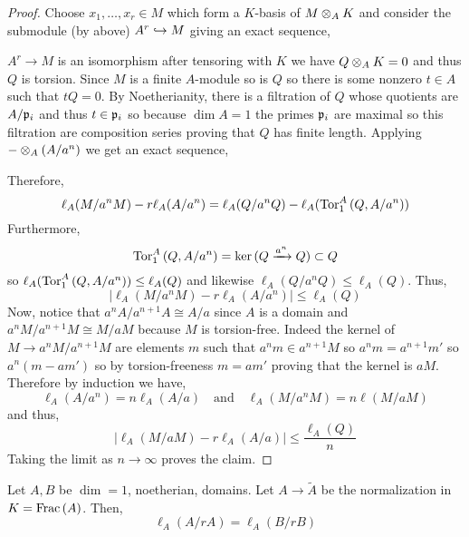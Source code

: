 \documentclass[12pt]{article}
\begin{document}
\begin{proof}
Choose $x_1, \dots, x_r \in M$ which form a $K$-basis of $M \otimes_A K$ and consider the submodule (by above) $A^r \hookrightarrow M$ giving an exact sequence,
\begin{center}
\end{center}
$A^r \to M$ is an isomorphism after tensoring with $K$ we have $Q \otimes_A K = 0$ and thus $Q$ is torsion. Since $M$ is a finite $A$-module so is $Q$ so there is some nonzero $t \in A$ such that $t Q = 0$. By Noetherianity, there is a filtration of $Q$ whose quotients are $A / \mathfrak{p}_i$ and thus $t \in \mathfrak{p}_i$ so because $\dim{A} = 1$ the primes $\mathfrak{p}_i$ are maximal so this filtration are composition series proving that $Q$ has finite length. Applying $- \otimes_A (A / a^n)$ we get an exact sequence,
\begin{center}
\end{center}
Therefore,
\[ \ell_A(M / a^n M) - r \ell_A(A / a^n) = \ell_A(Q / a^n Q) - \ell_A(\mathrm{Tor}^{A}_{1} \left( Q, A/a^n \right)) \]
Furthermore,
\[ \mathrm{Tor}^{A}_{1} \left( Q, A/a^n \right) = \ker{(Q \xrightarrow{a^n} Q)} \subset Q \]
so $\ell_A(\mathrm{Tor}^{A}_{1} \left( Q, A/a^n \right)) \le \ell_A(Q)$ and likewise $\ell_A(Q/a^n Q) \le \ell_A(Q)$. Thus,
\[ |\ell_A(M / a^n M) - r \ell_A(A / a^n)| \le \ell_A(Q) \]
Now, notice that $a^n A / a^{n+1} A \cong A / a$ since $A$ is a domain and $a^n M / a^{n+1} M \cong M / a M$ because $M$ is torsion-free. Indeed the kernel of $M \to a^n M / a^{n+1} M$ are elements $m$ such that $a^n m \in a^{n+1} M$ so $a^n m = a^{n+1} m'$ so $a^n (m - a m')$ so by torsion-freeness $m = a m'$ proving that the kernel is $a M$. Therefore by induction we have,
\[ \ell_A(A/a^n) = n \ell_A(A/a) \quad \text{and} \quad \ell_A(M / a^n M) = n \ell(M / a M) \]
and thus,
\[ | \ell_A(M / a M) - r \ell_A(A / a) | \le \frac{\ell_A(Q)}{n} \]
Taking the limit as $n \to \infty$ proves the claim.
\end{proof}

\begin{cor}
Let $A, B$ be $\dim = 1$, noetherian, domains. Let $A \to \tilde{A}$ be the normalization in $K = \mathrm{Frac}\left(A\right)$. Then,
\[ \ell_A(A / r A) = \ell_{A}(B / r B) \]
\end{cor}
\end{document}
